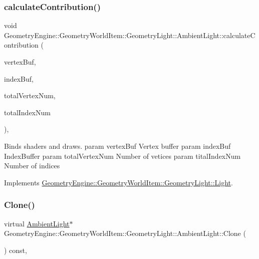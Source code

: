 \subsubsection{\texorpdfstring{calculateContribution()}{calculateContribution()}}
{\footnotesize\ttfamily void Geometry\+Engine\+::\+Geometry\+World\+Item\+::\+Geometry\+Light\+::\+Ambient\+Light\+::calculate\+Contribution (\begin{DoxyParamCaption}\item[{Q\+Open\+G\+L\+Buffer $\ast$}]{vertex\+Buf,  }\item[{Q\+Open\+G\+L\+Buffer $\ast$}]{index\+Buf,  }\item[{unsigned int}]{total\+Vertex\+Num,  }\item[{unsigned int}]{total\+Index\+Num }\end{DoxyParamCaption})\hspace{0.3cm}{\ttfamily [protected]}, {\ttfamily [virtual]}}

Binds shaders and draws. param vertex\+Buf Vertex buffer param index\+Buf Index\+Buffer param total\+Vertex\+Num Number of vetices param tital\+Index\+Num Number of indices 

Implements \mbox{\hyperlink{class_geometry_engine_1_1_geometry_world_item_1_1_geometry_light_1_1_light_a58aa2a3520f7aa2b03afcb4123e7530a}{Geometry\+Engine\+::\+Geometry\+World\+Item\+::\+Geometry\+Light\+::\+Light}}.

\mbox{\label{class_geometry_engine_1_1_geometry_world_item_1_1_geometry_light_1_1_ambient_light_a890a2ff8ce5cde88cdc51b4e598ca9af}} 
\subsubsection{\texorpdfstring{Clone()}{Clone()}}
{\footnotesize\ttfamily virtual \mbox{\hyperlink{class_geometry_engine_1_1_geometry_world_item_1_1_geometry_light_1_1_ambient_light}{Ambient\+Light}}$\ast$ Geometry\+Engine\+::\+Geometry\+World\+Item\+::\+Geometry\+Light\+::\+Ambient\+Light\+::\+Clone (\begin{DoxyParamCaption}{ }\end{DoxyParamCaption}) const\hspace{0.3cm}{\ttfamily [inline]}, {\ttfamily [virtual]}}


